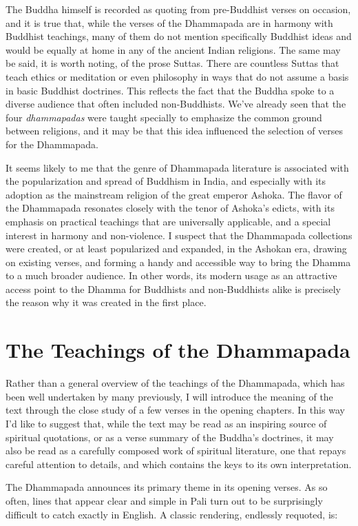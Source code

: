 \documentclass[12pt,openany]{book}%
\begin{document}
The Buddha himself is recorded as quoting from pre-Buddhist verses on occasion, and it is true that, while the verses of the Dhammapada are in harmony with Buddhist teachings, many of them do not mention specifically Buddhist ideas and would be equally at home in any of the ancient Indian religions. The same may be said, it is worth noting, of the prose Suttas. There are countless Suttas that teach ethics or meditation or even philosophy in ways that do not assume a basis in basic Buddhist doctrines. This reflects the fact that the Buddha spoke to a diverse audience that often included non-Buddhists. We’ve already seen that the four \textit{dhammapadas} were taught specially to emphasize the common ground between religions, and it may be that this idea influenced the selection of verses for the Dhammapada.

It seems likely to me that the genre of Dhammapada literature is associated with the popularization and spread of Buddhism in India, and especially with its adoption as the mainstream religion of the great emperor Ashoka. The flavor of the Dhammapada resonates closely with the tenor of Ashoka’s edicts, with its emphasis on practical teachings that are universally applicable, and a special interest in harmony and non-violence. I suspect that the Dhammapada collections were created, or at least popularized and expanded, in the Ashokan era, drawing on existing verses, and forming a handy and accessible way to bring the Dhamma to a much broader audience. In other words, its modern usage as an attractive access point to the Dhamma for Buddhists and non-Buddhists alike is precisely the reason why it was created in the first place.

\section*{The Teachings of the Dhammapada}

Rather than a general overview of the teachings of the Dhammapada, which has been well undertaken by many previously, I will introduce the meaning of the text through the close study of a few verses in the opening chapters. In this way I’d like to suggest that, while the text may be read as an inspiring source of spiritual quotations, or as a verse summary of the Buddha’s doctrines, it may also be read as a carefully composed work of spiritual literature, one that repays careful attention to details, and which contains the keys to its own interpretation.

The Dhammapada announces its primary theme in its opening verses. As so often, lines that appear clear and simple in Pali turn out to be surprisingly difficult to catch exactly in English. A classic rendering, endlessly requoted, is:
\end{document}
